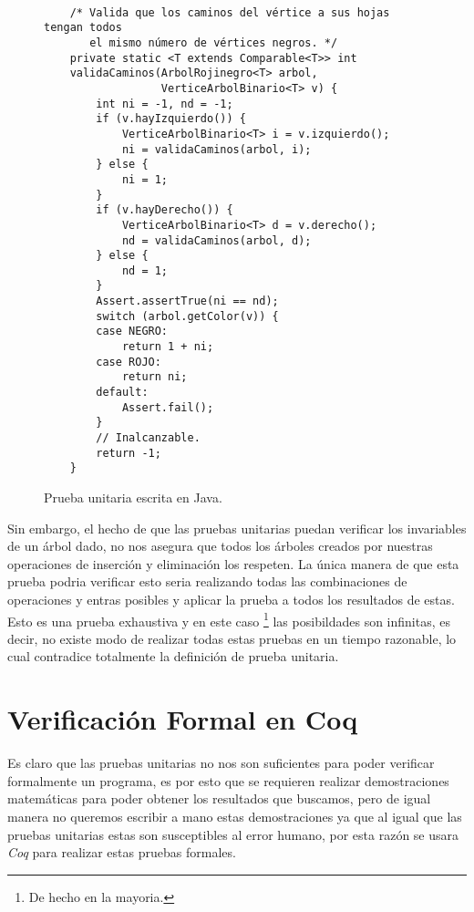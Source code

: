 \begin{figure}
\centering
\captionsetup{justification=centering}
\begin{verbatim}

    /* Valida que los caminos del vértice a sus hojas tengan todos
       el mismo número de vértices negros. */
    private static <T extends Comparable<T>> int
    validaCaminos(ArbolRojinegro<T> arbol,
                  VerticeArbolBinario<T> v) {
        int ni = -1, nd = -1;
        if (v.hayIzquierdo()) {
            VerticeArbolBinario<T> i = v.izquierdo();
            ni = validaCaminos(arbol, i);
        } else {
            ni = 1;
        }
        if (v.hayDerecho()) {
            VerticeArbolBinario<T> d = v.derecho();
            nd = validaCaminos(arbol, d);
        } else {
            nd = 1;
        }
        Assert.assertTrue(ni == nd);
        switch (arbol.getColor(v)) {
        case NEGRO:
            return 1 + ni;
        case ROJO:
            return ni;
        default:
            Assert.fail();
        }
        // Inalcanzable.
        return -1;
    }

\end{verbatim}
\caption{Prueba unitaria escrita en Java.\cite{CanekPU}}
\label{unitTestjava}
\end{figure}

Sin embargo, el hecho de que las pruebas unitarias puedan verificar los invariables de un \'arbol
dado, no nos asegura que todos los \'arboles creados por nuestras operaciones de inserci\'on y
eliminaci\'on los respeten. La \'unica manera de que esta prueba podria verificar esto seria
realizando todas las combinaciones de operaciones y entras posibles y aplicar la prueba a todos los
resultados de estas. Esto es una prueba exhaustiva y en este caso \footnote{De hecho en la
mayoria.} las posibildades son infinitas, es decir, no existe modo de realizar todas estas pruebas
en un tiempo razonable, lo cual contradice totalmente la definici\'on de prueba unitaria.


\section{Verificaci\'on Formal en Coq}

Es claro que las pruebas unitarias no nos son suficientes para poder verificar formalmente un
programa, es por esto que se requieren realizar demostraciones matemáticas para poder obtener los
resultados que buscamos, pero de igual manera no queremos escribir a mano estas demostraciones ya
que al igual que las pruebas unitarias estas son susceptibles al error humano, por esta raz\'on se
usara \textit{Coq} para realizar estas pruebas formales.

